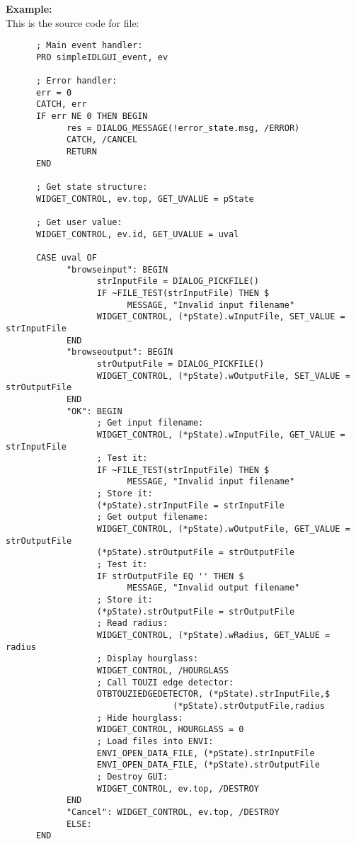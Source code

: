 \textbf{Example:}\\
      This is the source code for  file:\\
\begin{verbatim}
      ; Main event handler:
      PRO simpleIDLGUI_event, ev

      ; Error handler:
      err = 0
      CATCH, err
      IF err NE 0 THEN BEGIN
            res = DIALOG_MESSAGE(!error_state.msg, /ERROR)
            CATCH, /CANCEL
            RETURN
      END

      ; Get state structure:
      WIDGET_CONTROL, ev.top, GET_UVALUE = pState

      ; Get user value:
      WIDGET_CONTROL, ev.id, GET_UVALUE = uval

      CASE uval OF
            "browseinput": BEGIN
                  strInputFile = DIALOG_PICKFILE()
                  IF ~FILE_TEST(strInputFile) THEN $
                        MESSAGE, "Invalid input filename"
                  WIDGET_CONTROL, (*pState).wInputFile, SET_VALUE = strInputFile
            END
            "browseoutput": BEGIN
                  strOutputFile = DIALOG_PICKFILE()
                  WIDGET_CONTROL, (*pState).wOutputFile, SET_VALUE = strOutputFile
            END
            "OK": BEGIN
                  ; Get input filename:
                  WIDGET_CONTROL, (*pState).wInputFile, GET_VALUE = strInputFile
                  ; Test it:
                  IF ~FILE_TEST(strInputFile) THEN $
                        MESSAGE, "Invalid input filename"
                  ; Store it:
                  (*pState).strInputFile = strInputFile
                  ; Get output filename:
                  WIDGET_CONTROL, (*pState).wOutputFile, GET_VALUE = strOutputFile
                  (*pState).strOutputFile = strOutputFile
                  ; Test it:
                  IF strOutputFile EQ '' THEN $
                        MESSAGE, "Invalid output filename"
                  ; Store it:
                  (*pState).strOutputFile = strOutputFile
                  ; Read radius:
                  WIDGET_CONTROL, (*pState).wRadius, GET_VALUE = radius
                  ; Display hourglass:
                  WIDGET_CONTROL, /HOURGLASS
                  ; Call TOUZI edge detector:
                  OTBTOUZIEDGEDETECTOR, (*pState).strInputFile,$
		                         (*pState).strOutputFile,radius
                  ; Hide hourglass:
                  WIDGET_CONTROL, HOURGLASS = 0
                  ; Load files into ENVI:
                  ENVI_OPEN_DATA_FILE, (*pState).strInputFile
                  ENVI_OPEN_DATA_FILE, (*pState).strOutputFile
                  ; Destroy GUI:
                  WIDGET_CONTROL, ev.top, /DESTROY
            END
            "Cancel": WIDGET_CONTROL, ev.top, /DESTROY
            ELSE:
      END


\end{verbatim}
